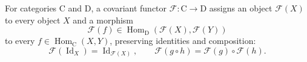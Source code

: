 \begin{definition}
\label{def:3-19-extra-4}
\mathlibok
For categories $\mathrm C$ and $\mathrm D$, a covariant functor
$\mathcal F:\mathrm C\to\mathrm D$ assigns an object $\mathcal F(X)$ to every
object $X$ and a morphism
\[
\mathcal F(f)\in
\operatorname{Hom}_{\mathrm D}(\mathcal F(X),\mathcal F(Y))
\]
to every $f\in\operatorname{Hom}_{\mathrm C}(X,Y)$, preserving identities and
composition:
\[
\mathcal F(\operatorname{Id}_X)=\operatorname{Id}_{\mathcal F(X)},
\qquad
\mathcal F(g\circ h)=\mathcal F(g)\circ\mathcal F(h).
\]
\end{definition}

